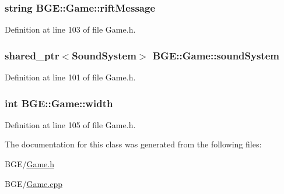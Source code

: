 \hypertarget{class_b_g_e_1_1_game_a736d9a0a78227f23a2afb62a9a5bed90}{
\subsubsection[{rift\-Message}]{\setlength{\rightskip}{0pt plus 5cm}string B\-G\-E\-::\-Game\-::rift\-Message}}\label{class_b_g_e_1_1_game_a736d9a0a78227f23a2afb62a9a5bed90}


Definition at line 103 of file Game.\-h.

\hypertarget{class_b_g_e_1_1_game_a4b56583497df19ed415237cc457cb622}{
\subsubsection[{sound\-System}]{\setlength{\rightskip}{0pt plus 5cm}shared\-\_\-ptr$<${\bf Sound\-System}$>$ B\-G\-E\-::\-Game\-::sound\-System}}\label{class_b_g_e_1_1_game_a4b56583497df19ed415237cc457cb622}


Definition at line 101 of file Game.\-h.

\hypertarget{class_b_g_e_1_1_game_a273be7b9be0947918bb9e8423aa03bfc}{
\subsubsection[{width}]{\setlength{\rightskip}{0pt plus 5cm}int B\-G\-E\-::\-Game\-::width}}\label{class_b_g_e_1_1_game_a273be7b9be0947918bb9e8423aa03bfc}


Definition at line 105 of file Game.\-h.



The documentation for this class was generated from the following files\-:\begin{DoxyCompactItemize}
\item 
B\-G\-E/\hyperlink{_game_8h}{Game.\-h}\item 
B\-G\-E/\hyperlink{_game_8cpp}{Game.\-cpp}\end{DoxyCompactItemize}

